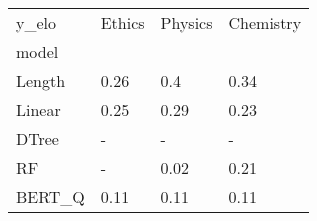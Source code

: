 \begin{tabular}{llll}
\toprule
y\_elo & Ethics & Physics & Chemistry \\
model  &        &         &           \\
\midrule
Length &   0.26 &     0.4 &      0.34 \\
Linear &   0.25 &    0.29 &      0.23 \\
DTree  &      - &       - &         - \\
RF     &      - &    0.02 &      0.21 \\
BERT\_Q &   0.11 &    0.11 &      0.11 \\
\bottomrule
\end{tabular}
